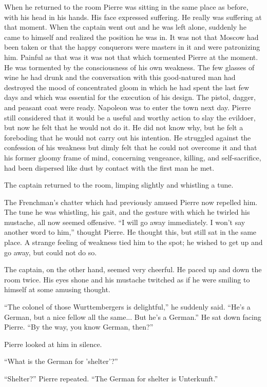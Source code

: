 When he returned to the room Pierre was sitting in the same place
as before, with his head in his hands. His face expressed
suffering. He really was suffering at that moment. When the
captain went out and he was left alone, suddenly he came to
himself and realized the position he was in. It was not that
Moscow had been taken or that the happy conquerors were masters
in it and were patronizing him. Painful as that was it was not
that which tormented Pierre at the moment. He was tormented by
the consciousness of his own weakness. The few glasses of wine he
had drunk and the conversation with this good-natured man had
destroyed the mood of concentrated gloom in which he had spent
the last few days and which was essential for the execution of
his design. The pistol, dagger, and peasant coat were
ready. Napoleon was to enter the town next day. Pierre still
considered that it would be a useful and worthy action to slay
the evildoer, but now he felt that he would not do it. He did not
know why, but he felt a foreboding that he would not carry out
his intention. He struggled against the confession of his
weakness but dimly felt that he could not overcome it and that
his former gloomy frame of mind, concerning vengeance, killing,
and self-sacrifice, had been dispersed like dust by contact with
the first man he met.

The captain returned to the room, limping slightly and whistling
a tune.

The Frenchman's chatter which had previously amused Pierre now
repelled him. The tune he was whistling, his gait, and the
gesture with which he twirled his mustache, all now seemed
offensive. ``I will go away immediately. I won't say another word
to him,'' thought Pierre. He thought this, but still sat in the
same place. A strange feeling of weakness tied him to the spot;
he wished to get up and go away, but could not do so.

The captain, on the other hand, seemed very cheerful. He paced up
and down the room twice. His eyes shone and his mustache twitched
as if he were smiling to himself at some amusing thought.

``The colonel of those Wurttembergers is delightful,'' he
suddenly said.  ``He's a German, but a nice fellow all the
same... But he's a German.''  He sat down facing Pierre. ``By the
way, you know German, then?''

Pierre looked at him in silence.

``What is the German for 'shelter'?''

``Shelter?'' Pierre repeated. ``The German for shelter is
Unterkunft.''

